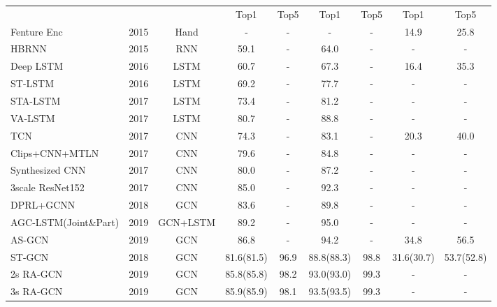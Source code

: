 \documentclass[runningheads]{llncs}
\begin{document}
\begin{table*}[h]
{\begin{tabular}{l c c c c c c c c}
		\\ \cmidrule(rl){4-5} \cmidrule(rl){6-7} \cmidrule(l){8-9}& 
		& & Top1  & Top5  & Top1  & Top5 & Top1  & Top5   \\
		\cmidrule(l){1-9}
        \multicolumn{1}{l}{Fenture Enc \cite{fernando2015modeling}} & 2015&Hand  & - & - & - & - & 14.9 & 25.8  \\
        \hline
		\multicolumn{1}{l}{HBRNN \cite{du2015hierarchical}}  &2015  & RNN & 59.1 & - & 64.0 &- &- &- \\
		\multicolumn{1}{l}{Deep LSTM \cite{shahroudy2016ntu}}&2016 & LSTM & 60.7 & - & 67.3 &- & 16.4 & 35.3\\
		\multicolumn{1}{l}{ST-LSTM \cite{liu2016spatio}}  &2016    & LSTM & 69.2 & - & 77.7 &- &- &- \\
		\multicolumn{1}{l}{STA-LSTM \cite{song2017end}}  &2017     & LSTM & 73.4 & - & 81.2 &- &- &- \\
		\multicolumn{1}{l}{VA-LSTM \cite{zhang2017view}} &2017     & LSTM & 80.7 & - & 88.8 &- &- &- \\
		\midrule
		\multicolumn{1}{l}{TCN \cite{kim2017interpretable}}  &2017   & CNN & 74.3 & - & 83.1 &-& 20.3 & 40.0 \\
		\multicolumn{1}{l}{Clips+CNN+MTLN \cite{ke2017new}} & 2017&  CNN & 79.6&- & 84.8  &- &  - &- \\
		\multicolumn{1}{l}{Synthesized CNN \cite{liu2017enhanced}}& 2017 & CNN &  80.0 &- & 87.2&-  &- &- \\
		\multicolumn{1}{l}{3scale ResNet152 \cite{li2017skeleton}} & 2017& CNN & 85.0 & - &  92.3  &-  &- &- \\
 	    \midrule
 		\multicolumn{1}{l}{DPRL+GCNN \cite{tang2018deep}} & 2018 &GCN &        83.6   &-   & 89.8 & - &-   &- \\
	    \multicolumn{1}{l}{AGC-LSTM(Joint\&Part) \cite{si2019attention}} & 2019 &GCN+LSTM &89.2 &- &95.0 &- &-&-  \\
		\multicolumn{1}{l}{AS-GCN \cite{li2019actional}}& 2019  &GCN &     86.8  & -   &   94.2  & -   & 34.8 & 56.5   \\
		\multicolumn{1}{l}{ST-GCN \cite{yan2018spatial}}& 2018  & GCN & 81.6(81.5) & 96.9 & 88.8(88.3)& 98.8 & 31.6(30.7) &53.7(52.8) \\
		\multicolumn{1}{l}{2s RA-GCN \cite{song2019richly}}& 2019 & GCN &  85.8(85.8) & 98.2 & 93.0(93.0) & 99.3  & - &- \\
		\multicolumn{1}{l}{3s RA-GCN \cite{song2019richly}}& 2019 & GCN &  85.9(85.9) & 98.1 & 93.5(93.5) & 99.3  & - &- \\

\end{tabular}}
\end{table*}
\end{document}
